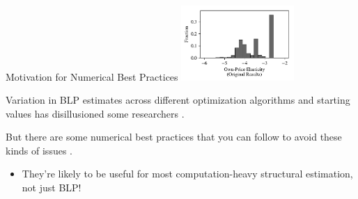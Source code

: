 \documentclass[aspectratio=169,t,11pt,table]{beamer}
\begin{document}
\begin{frame}{Motivation for Numerical Best Practices}
    \includegraphics[width=0.32\textwidth]{includes/elasticity_histogram_1.pdf}
    \begin{wideitemize}
        \item Variation in BLP estimates across different optimization algorithms and starting values has disillusioned some researchers \citep{knittel2014estimation}.
        \pause
        \item But there are some numerical best practices that you can follow to avoid these kinds of issues \citep{conlon2020best}.
        \begin{itemize}
            \item They're likely to be useful for most computation-heavy structural estimation, not just BLP!
        \end{itemize}
    \end{wideitemize}
\end{frame}
\end{document}
